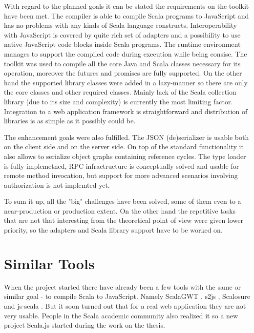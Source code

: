 \documentclass[12pt,a4paper]{report}
\begin{document}
With regard to the planned goals it can be stated the requirements on the toolkit have been met. The compiler is able to compile Scala programs to JavaScript and has no problems with any kinds of Scala language constructs. Interoperability with JavaScript is covered by quite rich set of adapters and a possibility to use native JavaScript code blocks inside Scala programs. The runtime environment manages to support the compiled code during execution while being consise. The toolkit was used to compile all the core Java and Scala classes necessary for its operation, moreover the futures and promises are fully supported. On the other hand the supported library classes were added in a lazy-manner so there are only the core classes and other required classes. Mainly lack of the Scala collection library (due to its size and complexity) is currently the most limiting factor. Integration to a web application framework is straightforward and distribution of libraries is as simple as it possibly could be.

The enhancement goals were also fulfilled. The JSON (de)serializer is usable both on the client side and on the server side. On top of the standard functionality it also allows to serialize object graphs containing reference cycles. The type loader is fully implemetned, RPC infractructure is conceptually solved and usable for remote method invocation, but support for more advanced scenarios involving authorization is not implemted yet.

To sum it up, all the "big" challenges have been solved, some of them even to a near-production or production extent. On the other hand the repetitive tasks that are not that interesting from the theoretical point of view were given lower priority, so the adapters and Scala library support have to be worked on.

\section{Similar Tools}

When the project started there have already been a few tools with the same or similar goal - to compile Scala to JavaScript. Namely ScalaGWT \cite{ScalaGwt}, s2js \cite{S2js}, Scalosure \cite{Scalosure} and js-scala  \cite{JsScala}. But it soon turned out that for a real web application they are not very usable. People in the Scala academic community also realized it so a new project Scala.js \cite{ScalaJs} started during the work on the thesis.
\end{document}
